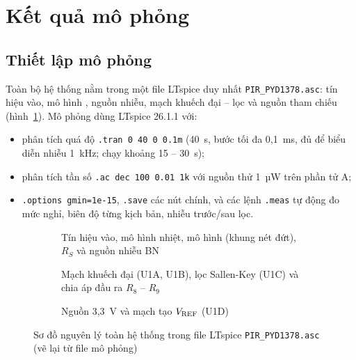\section{Kết quả mô phỏng}
\label{sec:ketqua}

\subsection{Thiết lập mô phỏng}

Toàn bộ hệ thống nằm trong một file LTspice duy nhất \texttt{PIR\_PYD1378.asc}: tín hiệu vào, mô hình \PYD{}, nguồn nhiễu, mạch khuếch đại -- lọc và nguồn tham chiếu (hình~\ref{fig:ltspice}). Mô phỏng dùng LTspice 26.1.1 với:
\begin{itemize}
  \item phân tích quá độ \texttt{.tran 0 40 0 0.1m} (40~s, bước tối đa 0,1~ms, đủ để biểu diễn nhiễu 1~kHz; chạy khoảng 15 -- 30~s);
  \item phân tích tần số \texttt{.ac dec 100 0.01 1k} với nguồn thử 1~µW trên phần tử A;
  \item \texttt{.options gmin=1e-15}, \texttt{.save} các nút chính, và các lệnh \texttt{.meas} tự động đo mức nghỉ, biên độ từng kịch bản, nhiễu trước/sau lọc.
\end{itemize}

\begin{landscape}
\begin{figure}[p]
\centering
\begin{subfigure}{\linewidth}\centering

\caption{Tín hiệu vào, mô hình nhiệt, mô hình \PYD{} (khung nét đứt), $R_S$ và nguồn nhiễu BN}
\end{subfigure}

\vspace{0.3cm}
\begin{subfigure}{\linewidth}\centering

\caption{Mạch khuếch đại (U1A, U1B), lọc Sallen-Key (U1C) và chia áp đầu ra $R_8$ -- $R_9$}
\end{subfigure}

\vspace{0.3cm}
\begin{subfigure}{\linewidth}\centering

\caption{Nguồn 3,3~V và mạch tạo $V_\mathrm{REF}$ (U1D)}
\end{subfigure}
\caption{Sơ đồ nguyên lý toàn hệ thống trong file LTspice \texttt{PIR\_PYD1378.asc} (vẽ lại từ file mô phỏng)}
\label{fig:ltspice}
\end{figure}
\end{landscape}

